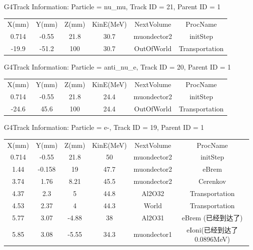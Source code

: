 \documentclass[aps,prd,superscriptaddress,nofootinbib,preprint]{ctexart}
\begin{document}
\begin{CJK}{UTF8}{gbsn}
G4Track Information:   Particle = nu\_mu,   Track ID = 21,   Parent ID = 1\\

\begin{center}
\begin{tabular}{|c|c|c|c|c|c|}
X(mm) & Y(mm) & Z(mm) & KinE(MeV)  & NextVolume & ProcName\\
0.714 & -0.55 &  21.8 & 30.7 &   muondector2 & initStep\\
-19.9 &   -51.2  &    100   &   30.7  & OutOfWorld  & Transportation

\end{tabular}
\end{center}

G4Track Information:   Particle =  anti\_nu\_e,   Track ID = 20,   Parent ID = 1\\

\begin{center}
\begin{tabular}{|c|c|c|c|c|c|}
X(mm) & Y(mm) & Z(mm) & KinE(MeV)  & NextVolume & ProcName\\
0.714 & -0.55 &  21.8 & 24.4 &   muondector2 & initStep\\
-24.6 &   45.6  &    100   &   24.4  & OutOfWorld  & Transportation

\end{tabular}
\end{center}



G4Track Information:   Particle = e-,   Track ID = 19,   Parent ID = 1\\

\begin{center}
\begin{tabular}{|c|c|c|c|c|c|}

X(mm)  &  Y(mm)  &  Z(mm) & KinE(MeV)  &  NextVolume & ProcName\\
0.714  &  -0.55   &  21.8 &    50  &    muondector2 & initStep\\
1.44  &  -0.158    &   19     &  47.7   & muondector2 & eBrem\\
3.74   &   1.76  &   8.21   &   45.5     &  muondector2 & Cerenkov\\
4.37    & 2.3 &  5  &  44.8   &     Al2O32  & Transportation\\
4.53  &   2.37  &  4 & 44.3  &     World & Transportation\\
5.77  &  3.07  & -4.88   &  38   &  Al2O31 & eBrem (已经到达了)\\
5.85  & 3.08 & -5.55  &   34.3   &  muondector1 & eIoni(已经到达了 0.0896MeV)\\
\end{tabular}
\end{center}



\end{CJK}
\end{document}
